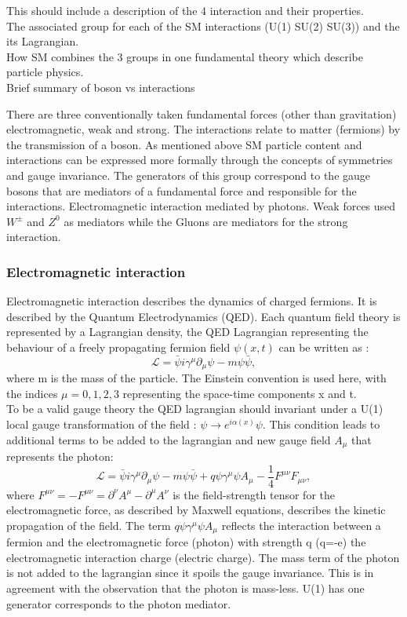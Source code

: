This should include a description of the 4 interaction and their properties.\\
The associated group for each of the SM interactions (U(1) SU(2) SU(3)) and the its Lagrangian.\\
How SM combines the 3 groups in one fundamental theory which describe particle physics.\\
Brief summary of boson vs interactions

There are three conventionally taken fundamental forces (other than gravitation) electromagnetic, weak and strong. The interactions relate to matter (fermions) by the transmission of a boson. As mentioned above SM particle content and interactions can be expressed more formally through the concepts of symmetries and gauge invariance. The generators of this group correspond to the gauge bosons that are mediators of a fundamental force and responsible for the interactions. Electromagnetic interaction mediated by photons. Weak forces used $W^{\pm}$ and $Z^{0}$ as mediators while the Gluons are mediators for the strong interaction.
\subsubsection{Electromagnetic interaction}
Electromagnetic interaction describes the dynamics of charged fermions. It is described by the Quantum Electrodynamics (QED). Each quantum field theory is represented by a Lagrangian density, the QED Lagrangian representing the behaviour of a freely propagating fermion field $\psi (x,t)$ can be written as : 
\begin{equation}
    \mathcal{L} = \bar{\psi}i\gamma^\mu\partial_\mu\psi - m\psi\bar{\psi},
\end{equation}
where m is the mass of the particle. The Einstein convention is used here, with the indices $\mu= 0,1,2,3$ representing the space-time components x and t. \\ 
To be a valid gauge theory the QED lagrangian should invariant under a U(1) local gauge transformation of the field : $\psi\rightarrow e^{i\alpha(x)}\psi$. This condition leads to additional terms to be added to the lagrangian and new gauge field $A_{\mu}$ that represents the photon:
\begin{equation}
    \mathcal{L} = \bar{\psi}i\gamma^\mu\partial_\mu\psi - m\psi\bar{\psi} + q\psi\gamma^{\mu}\psi A_{\mu} - \frac{1}{4}F^{\mu\nu}F_{\mu\nu},
\end{equation}
where $F^{\mu\nu} = - F^{\mu\nu} = \partial^{\nu}A^{\mu} - \partial^{\mu}A^{\nu}$ is the field-strength tensor for the electromagnetic force, as described by Maxwell equations, describes the kinetic propagation of the field. The term $q\psi\gamma^{\mu}\psi A_{\mu}$ reflects the interaction between a fermion and the electromagnetic force (photon) with strength q (q=-e) the electromagnetic interaction charge (electric charge). The mass term of the photon is not added to the lagrangian since it spoils the gauge invariance. This is in agreement with the observation that the photon is mass-less. U(1) has one generator corresponds to the photon mediator.
